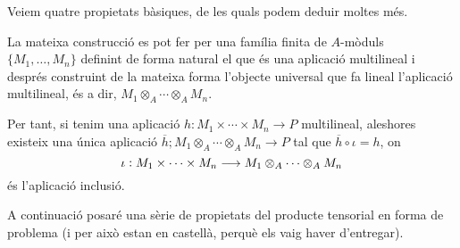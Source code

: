 \documentclass[../../../main.tex]{subfiles}
\begin{document}
Veiem quatre propietats bàsiques, de les quals podem deduir moltes més.

\begin{nota}
La mateixa construcció es pot fer per una família finita de $A$-mòduls $\{M_1,\ldots,M_n\}$ definint de forma natural el que és una aplicació multilineal i després construint de la mateixa forma l'objecte universal que fa lineal l'aplicació multilineal, és a dir, $M_1\otimes_A\cdots\otimes_AM_n$.

Per tant, si tenim una aplicació $h:M_1\times\cdots\times M_n\to P$ multilineal, aleshores existeix una única aplicació $\overline{h};M_1\otimes_A\cdots\otimes_AM_n\to P$ tal que $\overline{h}\circ\iota = h$, on 
\begin{equation}
    \notag
    \iota:M_1\times\cdots\times M_n\longrightarrow M_1\otimes_A\cdots\otimes_AM_n
\end{equation}
és l'aplicació inclusió.
\end{nota}

A continuació posaré una sèrie de propietats del producte tensorial en forma de problema (i per això estan en castellà, perquè els vaig haver d'entregar).
\end{document}
